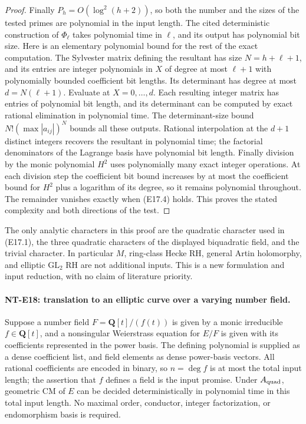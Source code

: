 \begin{proof}
Finally $P_h=O(\log^2(h+2))$, so both the number
and the sizes of the tested primes are polynomial
in the input length.
The cited deterministic construction of
$\Phi_\ell$ takes polynomial time in $\ell$,
and its output has polynomial bit size.
Here is an elementary polynomial bound for
the rest of the exact computation.
The Sylvester matrix defining the resultant
has size $N=h+\ell+1$, and its entries are
integer polynomials in $X$ of degree at most
$\ell+1$ with polynomially bounded coefficient
bit lengths.
Its determinant has degree at most
$d=N(\ell+1)$.
Evaluate at $X=0,\ldots,d$.
Each resulting integer matrix has entries of
polynomial bit length, and its determinant can
be computed by exact rational elimination
in polynomial time.
The determinant-size bound
$N!(\max|a_{ij}|)^N$ bounds all these outputs.
Rational interpolation at the $d+1$ distinct
integers recovers the resultant in polynomial
time; the factorial denominators of the
Lagrange basis have polynomial bit length.
Finally division by the monic polynomial $H^2$
uses polynomially many exact integer operations.
At each division step the coefficient bit bound
increases by at most the coefficient bound for
$H^2$ plus a logarithm of its degree, so it
remains polynomial throughout.
The remainder vanishes exactly when (E17.4)
holds. This proves the stated complexity
and both directions of the test.
\end{proof}

The only analytic characters in this proof are the
quadratic character used in (E17.1), the three
quadratic characters of the displayed biquadratic
field, and the trivial character.
In particular $M$, ring-class Hecke RH, general
Artin holomorphy, and elliptic $\mathrm{GL}_2$ RH
are not additional inputs.
This is a new formulation and input reduction,
with no claim of literature priority.

\paragraph{NT-E18: translation to an elliptic curve over a varying number field.}
Suppose a number field
$F=\mathbf Q[t]/(f(t))$ is given by a monic
irreducible $f\in\mathbf Q[t]$, and a nonsingular
Weierstrass equation for $E/F$ is given with
its coefficients represented in the power basis.
The defining polynomial is supplied as a dense
coefficient list, and field elements as dense
power-basis vectors. All rational coefficients
are encoded in binary, so $n=\deg f$ is at most
the total input length;
the assertion that $f$ defines a field is the
input promise.
Under $A_{\rm quad}$, geometric CM of $E$
can be decided deterministically in polynomial
time in this total input length.
No maximal order, conductor, integer factorization,
or endomorphism basis is required.


